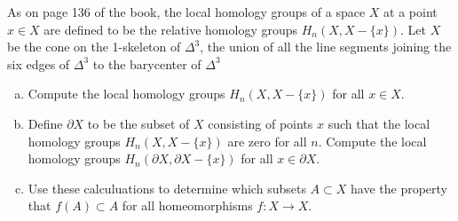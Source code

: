 \documentclass{article}
\begin{document}
\begin{problem}{3}{\parindent}
  As on page 136 of the book, the local homology groups of a space $X$
  at a point $x \in X$ are defined to be the relative homology groups
  $H_n(X,X-\{x\})$. Let $X$ be the cone on the 1-skeleton of
  $\Delta^3$, the union of all the line segments joining the six edges
  of $\Delta^3$ to the barycenter of $\Delta^3$
  \begin{enumerate}[(a)]
  \item Compute the local homology groups $H_n(X,X-\{x\})$ for all $x
    \in X$.
  \item Define $\partial X$ to be the subset of $X$ consisting of
    points $x$ such that the local homology groups $H_n(X,X-\{x\})$
    are zero for all $n$. Compute the local homology groups
    $H_n(\partial X,\partial X - \{x\})$ for all $x \in \partial X$.
  \item Use these calculuations to determine which subsets $A \subset
    X$ have the property that $f(A) \subset A$ for all homeomorphisms
    $f:X \to X$.
  \end{enumerate}
\end{problem}
\end{document}

